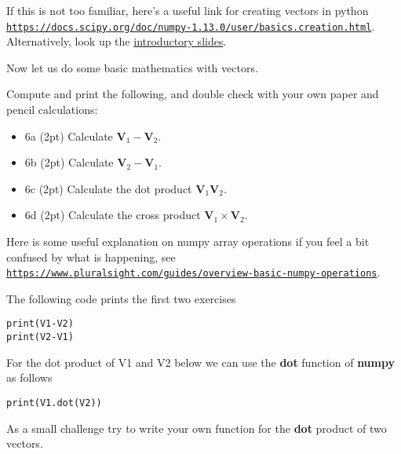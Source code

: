 \documentclass[%
oneside,                 %
final,                   %
10pt]{article}
\begin{document}
If this is not too familiar, here's a useful link for creating vectors in python
\href{{https://docs.scipy.org/doc/numpy-1.13.0/user/basics.creation.html}}{\nolinkurl{https://docs.scipy.org/doc/numpy-1.13.0/user/basics.creation.html}}. Alternatively, look up the \href{{https://mhjensen.github.io/Physics321/doc/pub/week2/html/week2.html}}{introductory slides}.

Now let us do some basic mathematics with vectors.

Compute and print the following, and double check with your own paper and pencil calculations:

\begin{itemize}
\item 6a (2pt)  Calculate $\bm{V}_1-\bm{V}_2$.

\item 6b (2pt)  Calculate $\bm{V}_2-\bm{V}_1$.

\item 6c (2pt) Calculate the dot product $\bm{V}_1\bm{V}_2$.

\item 6d (2pt) Calculate the cross product $\bm{V}_1\times\bm{V}_2$.
\end{itemize}

\noindent
Here is some useful explanation on numpy array operations if you feel a bit confused by what is happening,
see \href{{https://www.pluralsight.com/guides/overview-basic-numpy-operations}}{\nolinkurl{https://www.pluralsight.com/guides/overview-basic-numpy-operations}}.

The following code prints the first two exercises



\begin{verbatim}
print(V1-V2)
print(V2-V1)

\end{verbatim}


For the dot product of V1 and V2 below we can use the \textbf{dot} function of \textbf{numpy} as follows


\begin{verbatim}
print(V1.dot(V2))

\end{verbatim}

As a small challenge try to write your own function for the \textbf{dot} product of two vectors.
\end{document}
